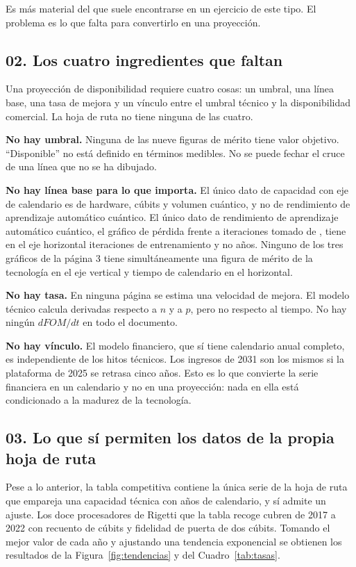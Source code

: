 \documentclass[11pt,letterpaper]{article}
\begin{document}
Es más material del que suele encontrarse en un ejercicio de este tipo. El
problema es lo que falta para convertirlo en una proyección.

\subsection*{02. Los cuatro ingredientes que faltan}

Una proyección de disponibilidad requiere cuatro cosas: un umbral, una línea
base, una tasa de mejora y un vínculo entre el umbral técnico y la
disponibilidad comercial. La hoja de ruta no tiene ninguna de las cuatro.

\textbf{No hay umbral.} Ninguna de las nueve figuras de mérito tiene valor
objetivo. \enquote{Disponible} no está definido en términos medibles. No se
puede fechar el cruce de una línea que no se ha dibujado.

\textbf{No hay línea base para lo que importa.} El único dato de capacidad con
eje de calendario es de hardware, cúbits y volumen cuántico, y no de
rendimiento de aprendizaje automático cuántico. El único dato de rendimiento de
aprendizaje automático cuántico, el gráfico de pérdida frente a iteraciones
tomado de \textcite{huang2021}, tiene en el eje horizontal iteraciones de
entrenamiento y no años. Ninguno de los tres gráficos de la página 3 tiene
simultáneamente una figura de mérito de la tecnología en el eje vertical y
tiempo de calendario en el horizontal.

\textbf{No hay tasa.} En ninguna página se estima una velocidad de mejora. El
modelo técnico calcula derivadas respecto a $n$ y a $p$, pero no respecto al
tiempo. No hay ningún $dFOM/dt$ en todo el documento.

\textbf{No hay vínculo.} El modelo financiero, que sí tiene calendario anual
completo, es independiente de los hitos técnicos. Los ingresos de 2031 son los
mismos si la plataforma de 2025 se retrasa cinco años. Esto es lo que convierte
la serie financiera en un calendario y no en una proyección: nada en ella está
condicionado a la madurez de la tecnología.

\subsection*{03. Lo que sí permiten los datos de la propia hoja de ruta}

Pese a lo anterior, la tabla competitiva contiene la única serie de la hoja de
ruta que empareja una capacidad técnica con años de calendario, y sí admite un
ajuste. Los doce procesadores de Rigetti que la tabla recoge cubren de 2017 a
2022 con recuento de cúbits y fidelidad de puerta de dos cúbits. Tomando el
mejor valor de cada año y ajustando una tendencia exponencial se obtienen los
resultados de la Figura~\ref{fig:tendencias} y del Cuadro~\ref{tab:tasas}.
\end{document}
